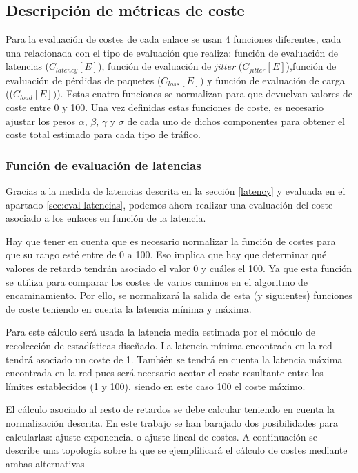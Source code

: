 \documentclass[a4paper,11pt]{book}
\begin{document}
\subsection{Descripción de métricas de coste}\label{funcionesEvaluacion}

Para la evaluación de costes de cada enlace se usan 4 funciones diferentes, cada una relacionada con el tipo de evaluación que realiza: función de evaluación de latencias ($C_{latency}[E]$), función de evaluación de \textit{jitter} ($C_{jitter}[E]$),función de evaluación de pérdidas de paquetes ($C_{loss}[E])$ y función de evaluación de carga (($C_{load}[E])$). 
 Estas cuatro funciones se normalizan para que devuelvan valores de coste entre 0 y 100. Una vez definidas estas funciones de coste, es necesario ajustar los pesos $\alpha$, $\beta$, $\gamma$ y $\sigma$ de cada uno de dichos componentes para obtener el coste total estimado para cada tipo de tráfico. 
 
\subsubsection{Función de evaluación de latencias}

Gracias a la medida de latencias descrita en la sección \ref{latency} y evaluada en el apartado \ref{sec:eval-latencias}, podemos ahora realizar una evaluación del coste asociado a los enlaces en función de la latencia.  

 Hay que tener en cuenta que es necesario normalizar la función de costes para que su rango esté entre de 0 a 100. Eso implica que hay que determinar qué valores de retardo tendrán asociado el valor 0 y cuáles el 100. Ya que esta función se utiliza para comparar los costes de varios caminos en el algoritmo de encaminamiento. Por ello, se normalizará la salida de esta (y siguientes) funciones de coste teniendo en cuenta la latencia mínima  y máxima.
 
 Para este cálculo será usada la latencia media estimada por el módulo de recolección de estadísticas diseñado. La latencia mínima encontrada en la red tendrá asociado un coste de 1. También se tendrá en cuenta la latencia máxima encontrada en la red pues será necesario acotar el coste resultante entre los límites establecidos (1 y 100), siendo en este caso 100 el coste máximo.

 El cálculo asociado al resto de retardos se debe calcular teniendo en cuenta la normalización descrita. En este trabajo se han barajado dos posibilidades para calcularlas: ajuste exponencial o ajuste lineal de costes. A continuación se describe una topología sobre la que se ejemplificará el cálculo de costes mediante ambas alternativas
 
\end{document}
